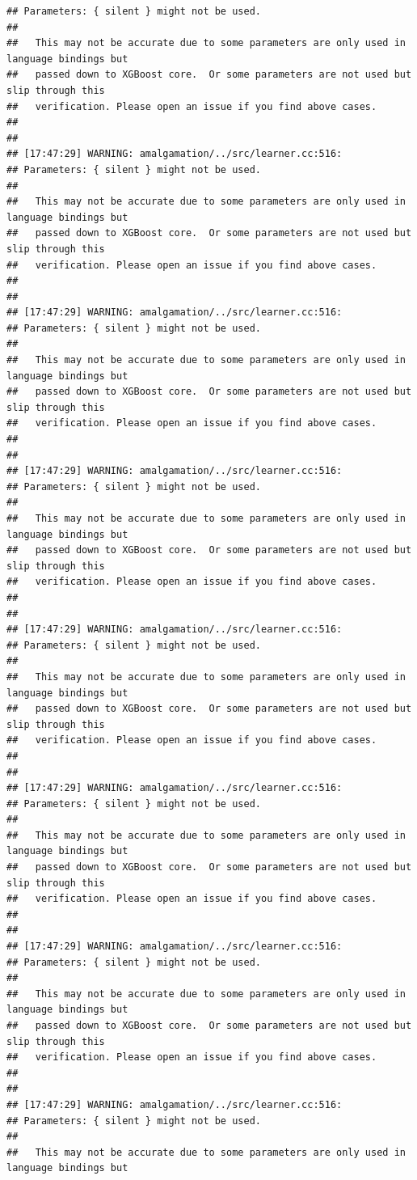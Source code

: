 \documentclass[AMS,STIX2COL]{WileyNJD-v2}\usepackage[]{graphicx}\usepackage[]{color}
\makeatletter
\newenvironment{kframe}{%
 \def\at@end@of@kframe{}%
 \ifinner\ifhmode%
  \def\at@end@of@kframe{\end{minipage}}%
  \begin{minipage}{\columnwidth}%
 \fi\fi%
 \def\FrameCommand##1{\hskip\@totalleftmargin \hskip-\fboxsep
 \colorbox{shadecolor}{##1}\hskip-\fboxsep
     \hskip-\linewidth \hskip-\@totalleftmargin \hskip\columnwidth}%
 \MakeFramed {\advance\hsize-\width
   \@totalleftmargin\z@ \linewidth\hsize
   \@setminipage}}%
 {\par\unskip\endMakeFramed%
 \at@end@of@kframe}
\newenvironment{knitrout}{}{} %
\makeatother
\begin{document}
\begin{knitrout}
\begin{kframe}
\begin{verbatim}
## Parameters: { silent } might not be used.
## 
##   This may not be accurate due to some parameters are only used in language bindings but
##   passed down to XGBoost core.  Or some parameters are not used but slip through this
##   verification. Please open an issue if you find above cases.
## 
## 
## [17:47:29] WARNING: amalgamation/../src/learner.cc:516: 
## Parameters: { silent } might not be used.
## 
##   This may not be accurate due to some parameters are only used in language bindings but
##   passed down to XGBoost core.  Or some parameters are not used but slip through this
##   verification. Please open an issue if you find above cases.
## 
## 
## [17:47:29] WARNING: amalgamation/../src/learner.cc:516: 
## Parameters: { silent } might not be used.
## 
##   This may not be accurate due to some parameters are only used in language bindings but
##   passed down to XGBoost core.  Or some parameters are not used but slip through this
##   verification. Please open an issue if you find above cases.
## 
## 
## [17:47:29] WARNING: amalgamation/../src/learner.cc:516: 
## Parameters: { silent } might not be used.
## 
##   This may not be accurate due to some parameters are only used in language bindings but
##   passed down to XGBoost core.  Or some parameters are not used but slip through this
##   verification. Please open an issue if you find above cases.
## 
## 
## [17:47:29] WARNING: amalgamation/../src/learner.cc:516: 
## Parameters: { silent } might not be used.
## 
##   This may not be accurate due to some parameters are only used in language bindings but
##   passed down to XGBoost core.  Or some parameters are not used but slip through this
##   verification. Please open an issue if you find above cases.
## 
## 
## [17:47:29] WARNING: amalgamation/../src/learner.cc:516: 
## Parameters: { silent } might not be used.
## 
##   This may not be accurate due to some parameters are only used in language bindings but
##   passed down to XGBoost core.  Or some parameters are not used but slip through this
##   verification. Please open an issue if you find above cases.
## 
## 
## [17:47:29] WARNING: amalgamation/../src/learner.cc:516: 
## Parameters: { silent } might not be used.
## 
##   This may not be accurate due to some parameters are only used in language bindings but
##   passed down to XGBoost core.  Or some parameters are not used but slip through this
##   verification. Please open an issue if you find above cases.
## 
## 
## [17:47:29] WARNING: amalgamation/../src/learner.cc:516: 
## Parameters: { silent } might not be used.
## 
##   This may not be accurate due to some parameters are only used in language bindings but

\end{verbatim}
\end{kframe}
\end{knitrout}
\end{document}
